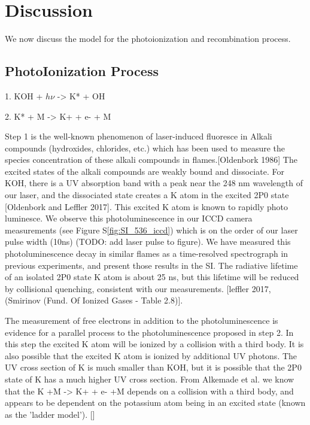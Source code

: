 \section{Discussion}

We now discuss the model for the photoionization and recombination process. 

\subsection{PhotoIonization Process}

1. KOH + $h\nu$ -> K* + OH

2. K* + M -> K+ + e- + M


Step 1 is the well-known phenomenon of laser-induced fluoresce in Alkali compounds (hydroxides, chlorides, etc.) which has been used to measure the species concentration of these alkali compounds in flames.[Oldenbork 1986] The excited states of the alkali compounds are weakly bound and dissociate. For KOH, there is a UV absorption band with a peak near the 248 nm wavelength of our laser, and the dissociated state creates a K atom in the excited 2P0 state [Oldenbork and Leffler 2017]. This excited K atom is known to rapidly photo luminesce. We observe this photoluminescence in our ICCD camera measurements (see Figure S\ref*{fig:SI_536_iccd}) which is on the order of our laser pulse width (10ns) (TODO: add laser pulse to figure). We have measured this photoluminescence decay in similar flames as a time-resolved spectrograph in previous experiments, and present those results in the SI. The radiative lifetime of an isolated 2P0 state K atom is about 25 ns, but this lifetime will be reduced by collisional quenching, consistent with our measurements. [leffler 2017, (Smirinov (Fund. Of Ionized Gases - Table 2.8)]. 

The measurement of free electrons in addition to the photoluminescence is evidence for a parallel process to the photoluminescence proposed in step 2. In this step the excited K atom will be ionized by a collision with a third body. It is also possible that the excited K atom is ionized by additional UV photons. The UV cross section of K is much smaller than KOH, but it is possible that the 2P0 state of K has a much higher UV cross section. From Alkemade et al. we know that the K +M -> K+ + e- +M depends on a collision with a third body, and appears to be dependent on the potassium atom being in an excited state (known as the 'ladder model'). []

